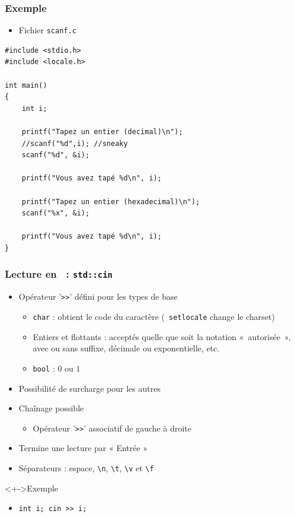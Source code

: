 \begin{frame}[containsverbatim]
\frametitle{Exemple}
\begin{itemize}
\item Fichier \texttt{scanf.c}
\end{itemize}
\begin{lstlisting}
#include <stdio.h>
#include <locale.h>

int main()
{	
	int i;

	printf("Tapez un entier (decimal)\n");
	//scanf("%d",i); //sneaky
	scanf("%d", &i);
	
	printf("Vous avez tapé %d\n", i);
	
	printf("Tapez un entier (hexadecimal)\n");
	scanf("%x", &i);
		
	printf("Vous avez tapé %d\n", i);
}
\end{lstlisting}
\end{frame}

\begin{frame}
\frametitle{Lecture en \cpp\ : \texttt{std::cin}}
\begin{itemize}[<+->]
\item Opérateur '\texttt{>>}' défini pour les types de base
	\begin{itemize}
	\item \lstinline|char| : obtient le code du caractère (\texttt{	setlocale} change le charset)
	\item Entiers et flottants : acceptés quelle que soit la notation «~autorisée~», avec ou sans suffixe, décimale ou exponentielle, etc.
	\item \lstinline|bool| : $0$ ou $1$
	\end{itemize}
\item Possibilité de surcharge pour les autres
\item Chaînage possible
	\begin{itemize}
	\item Opérateur '\texttt{>>}' associatif de gauche à droite
	\end{itemize}
\item Termine une lecture par « Entrée »
\item Séparateurs : espace, \texttt{\textbackslash{}n}, \texttt{\textbackslash{}t}, \texttt{\textbackslash{}v} et \texttt{\textbackslash{}f}
\end{itemize}
\begin{exampleblock}<+->{Exemple}
	\begin{itemize}[<+->]
	\item \lstinline|int i; cin >> i;|
	\end{itemize}
\end{exampleblock}
\end{frame}

